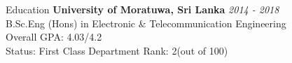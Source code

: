 \documentclass[
	11pt, %
]{./../assets/resume} %
\begin{document}

\begin{rSection}{Education}
	\textbf{University of Moratuwa, Sri Lanka} \hfill \textit{2014 - 2018} \\
	B.Sc.Eng (Hons) in Electronic \& Telecommunication Engineering \\
	Overall GPA: 4.03/4.2 \\
	Status: First Class
        Department Rank: 2(out of 100)

\end{rSection}

\end{document}
